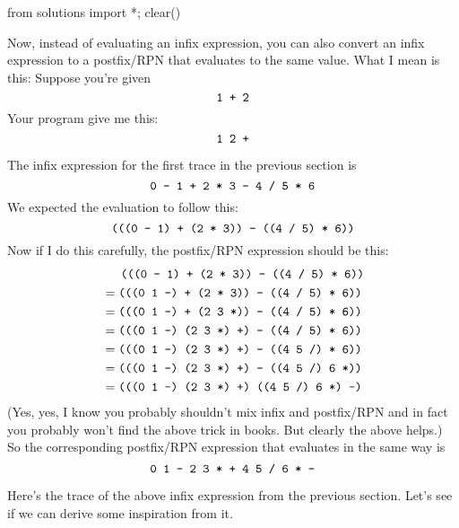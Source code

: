 \begin{python0}
from solutions import *; clear()
\end{python0}

Now, instead of evaluating an infix expression,
you can also convert an infix expression to a postfix/RPN
that evaluates to the same value.
What I mean is this:
Suppose you're given
\[
\text{\texttt{1 + 2}}
\]
Your program give me this:
\[
\text{\texttt{1 2 +}}
\]

The infix expression for the
first trace in the previous section is
\[
\text{\texttt{0 - 1 + 2 * 3 - 4 / 5 * 6}}
\]
We expected the evaluation to follow this:
\[
\text{\texttt{(((0 - 1) + (2 * 3)) - ((4 / 5) * 6))}}
\]
Now if I do this carefully, the postfix/RPN expression should be this:
\begin{align*}
& \hspace{0.53cm} \text{\texttt{(((0 - 1) + (2 * 3)) - ((4 / 5) * 6))}} \\
&= \text{\texttt{(((0 1 -) + (2 * 3)) - ((4 / 5) * 6))}} \\
&= \text{\texttt{(((0 1 -) + (2 3 *)) - ((4 / 5) * 6))}} \\
&= \text{\texttt{(((0 1 -) (2 3 *) +) - ((4 / 5) * 6))}} \\
&= \text{\texttt{(((0 1 -) (2 3 *) +) - ((4 5 /) * 6))}} \\
&= \text{\texttt{(((0 1 -) (2 3 *) +) - ((4 5 /) 6 *))}} \\
&= \text{\texttt{(((0 1 -) (2 3 *) +) ((4 5 /) 6 *) -)}} 
\end{align*}
(Yes, yes, I know you probably shouldn't mix infix and postfix/RPN
and in fact you probably won't find the above trick in books.
But clearly the above helps.)
So the corresponding  postfix/RPN expression that evaluates in the same way
is
\[
\text{\texttt{0 1 - 2 3 * + 4 5 / 6 * -}} 
\]

Here's the trace of the above infix expression from the previous
section.
Let's see if we can derive some inspiration from it.

